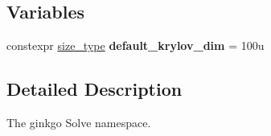 \subsection*{Variables}
\begin{DoxyCompactItemize}
\item 
\mbox{\label{namespacegko_1_1solver_a39b458ab377c785ee54f5e4cbe7ab1a6}} 
constexpr \hyperlink{namespacegko_a6e5c95df0ae4e47aab2f604a22d98ee7}{size\+\_\+type} {\bfseries default\+\_\+krylov\+\_\+dim} = 100u
\end{DoxyCompactItemize}


\subsection{Detailed Description}
The ginkgo Solve namespace. 